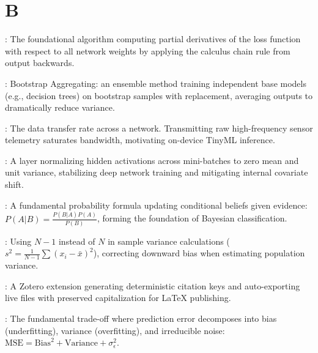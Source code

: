 \section*{B}
\begin{description}[leftmargin=!,labelwidth=4.5cm,itemsep=1.5ex]
\item[\textbf{Backpropagation}\hfill \textnormal{\sffamily\scriptsize\color{keyideablue}[Deep Learning]}]: The foundational algorithm computing partial derivatives of the loss function with respect to all network weights by applying the calculus chain rule from output backwards.
\item[\textbf{Bagging}\hfill \textnormal{\sffamily\scriptsize\color{keyideablue}[Classical ML]}]: Bootstrap Aggregating: an ensemble method training independent base models (e.g., decision trees) on bootstrap samples with replacement, averaging outputs to dramatically reduce variance.
\item[\textbf{Bandwidth}\hfill \textnormal{\sffamily\scriptsize\color{keyideablue}[IoT \& Networking]}]: The data transfer rate across a network. Transmitting raw high-frequency sensor telemetry saturates bandwidth, motivating on-device TinyML inference.
\item[\textbf{Batch Normalization}\hfill \textnormal{\sffamily\scriptsize\color{keyideablue}[Deep Learning]}]: A layer normalizing hidden activations across mini-batches to zero mean and unit variance, stabilizing deep network training and mitigating internal covariate shift.
\item[\textbf{Bayes' Theorem}\hfill \textnormal{\sffamily\scriptsize\color{keyideablue}[Mathematics]}]: A fundamental probability formula updating conditional beliefs given evidence: $P(A|B) = \frac{P(B|A) P(A)}{P(B)}$, forming the foundation of Bayesian classification.
\item[\textbf{Bessel's Correction}\hfill \textnormal{\sffamily\scriptsize\color{keyideablue}[Statistics]}]: Using $N - 1$ instead of $N$ in sample variance calculations ($s^2 = \frac{1}{N-1} \sum (x_i - \bar{x})^2$), correcting downward bias when estimating population variance.
\item[\textbf{Better BibTeX (BBT)}\hfill \textnormal{\sffamily\scriptsize\color{keyideablue}[Research Tools]}]: A Zotero extension generating deterministic citation keys and auto-exporting live  files with preserved capitalization for \LaTeX{} publishing.
\item[\textbf{Bias-Variance Tradeoff}\hfill \textnormal{\sffamily\scriptsize\color{keyideablue}[Classical ML]}]: The fundamental trade-off where prediction error decomposes into bias (underfitting), variance (overfitting), and irreducible noise: $\text{MSE} = \text{Bias}^2 + \text{Variance} + \sigma_\epsilon^2$.

\end{description}
